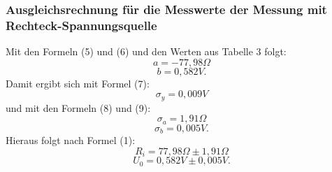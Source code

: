 \subsubsection{Ausgleichsrechnung für die Messwerte der Messung mit Rechteck-Spannungsquelle}
Mit den Formeln (5) und (6) und den Werten aus Tabelle 3 folgt:
\begin{displaymath}
a=-77,98\Omega
\end{displaymath}
\begin{displaymath}
b=0,582V\text{.}
\end{displaymath}
Damit ergibt sich mit Formel (7):
\begin{displaymath}
\sigma_y=0,009V
\end{displaymath}
und mit den Formeln (8) und (9):
\begin{displaymath}
\sigma_a=1,91\Omega
\end{displaymath}
\begin{displaymath}
\sigma_b=0,005V\text{.}
\end{displaymath}
Hieraus folgt nach Formel (1):
\begin{displaymath}
R_i=77,98\Omega\pm 1,91\Omega
\end{displaymath}
\begin{displaymath}
U_0=0,582V\pm 0,005V\text{.}
\end{displaymath}

